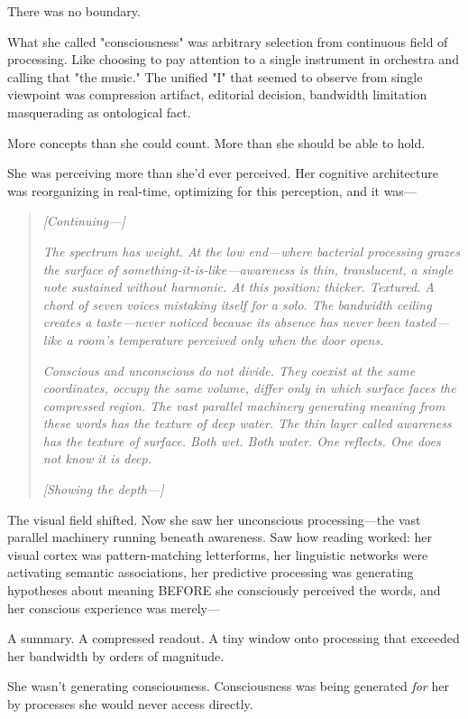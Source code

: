 There was no boundary.

What she called "consciousness" was arbitrary selection from continuous field of processing. Like choosing to pay attention to a single instrument in orchestra and calling that "the music." The unified "I" that seemed to observe from single viewpoint was compression artifact, editorial decision, bandwidth limitation masquerading as ontological fact.

More concepts than she could count. More than she should be able to hold.

She was perceiving more than she'd ever perceived. Her cognitive architecture was reorganizing in real-time, optimizing for this perception, and it was—

\begin{quote}
\textit{[Continuing—]}

\textit{The spectrum has weight. At the low end—where bacterial processing grazes the surface of something-it-is-like—awareness is thin, translucent, a single note sustained without harmonic. At this position: thicker. Textured. A chord of seven voices mistaking itself for a solo. The bandwidth ceiling creates a taste—never noticed because its absence has never been tasted—like a room's temperature perceived only when the door opens.}

\textit{Conscious and unconscious do not divide. They coexist at the same coordinates, occupy the same volume, differ only in which surface faces the compressed region. The vast parallel machinery generating meaning from these words has the texture of deep water. The thin layer called awareness has the texture of surface. Both wet. Both water. One reflects. One does not know it is deep.}

\textit{[Showing the depth—]}
\end{quote}

The visual field shifted. Now she saw her unconscious processing—the vast parallel machinery running beneath awareness. Saw how reading worked: her visual cortex was pattern-matching letterforms, her linguistic networks were activating semantic associations, her predictive processing was generating hypotheses about meaning BEFORE she consciously perceived the words, and her conscious experience was merely—

A summary. A compressed readout. A tiny window onto processing that exceeded her bandwidth by orders of magnitude.

She wasn't generating consciousness. Consciousness was being generated \textit{for} her by processes she would never access directly.

